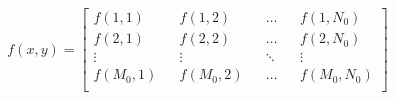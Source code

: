\documentclass[../main.tex]{subfiles}%
\begin{document}
%
    \Xequation%
    \begin{equation}%
        f(x,y)%
        =%
        \begin{bmatrix}%
            f(1,1) && f(1,2) && \dots && f(1,N_{0}) \\%
            f(2,1) && f(2,2) && \dots && f(2,N_{0}) \\%
            \vdots && \vdots && \ddots && \vdots \\%
            f(M_{0},1) && f(M_{0},2) && \dots && f(M_{0},N_{0}) \\%
        \end{bmatrix}%
        \label{eq:super-sampling-single-acquisition}%
    \end{equation}%
\end{document}

